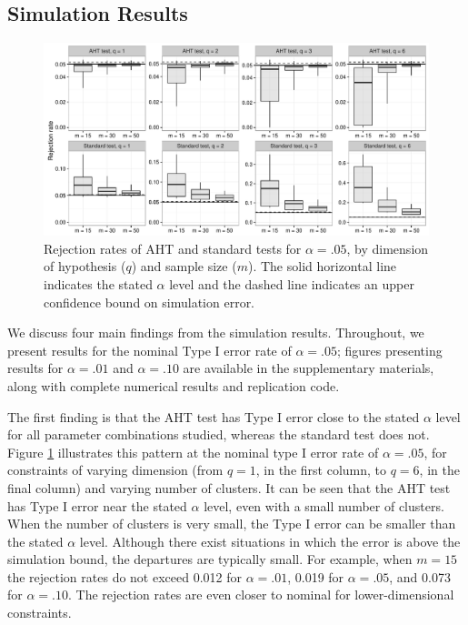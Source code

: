\documentclass[12pt]{article}\usepackage[]{graphicx}\usepackage[]{color}
\newenvironment{knitrout}{}{} %
\begin{document}
\subsection{Simulation Results}



\begin{knitrout}
\color{fgcolor}\begin{figure}

{\centering \includegraphics[width=\linewidth]{CR_fig/overview-1} 

}

\caption[Rejection rates of AHT and standard tests for ]{Rejection rates of AHT and standard tests for $\alpha = .05$, by dimension of hypothesis ($q$) and sample size ($m$). The solid horizontal line indicates the stated $\alpha$ level and the dashed line indicates an upper confidence bound on simulation error.}\label{fig:overview}
\end{figure}


\end{knitrout}

We discuss four main findings from the simulation results.
Throughout, we present results for the nominal Type I error rate of $\alpha = .05$; figures presenting results for $\alpha = .01$ and $\alpha = .10$ are available in the supplementary materials, along with complete numerical results and replication code.

The first finding is that the AHT test has Type I error close to the stated $\alpha$ level for all parameter combinations studied, whereas the standard test does not. 
Figure \ref{fig:overview} illustrates this pattern at the nominal type I error rate of $\alpha = .05$, for constraints of varying dimension (from $q = 1$, in the first column, to $q = 6$, in the final column) and varying number of clusters.
It can be seen that the AHT test has Type I error near the stated $\alpha$ level, even with a small number of clusters.
When the number of clusters is very small, the Type I error can be smaller than the stated $\alpha$ level. 
Although there exist situations in which the error is above the simulation bound, the departures are typically small. For example, when $m = 15$ the rejection rates do not exceed 0.012 for $\alpha = .01$, 0.019 for $\alpha = .05$, and 0.073 for $\alpha = .10$.
The rejection rates are even closer to nominal for lower-dimensional constraints.
\end{document}
